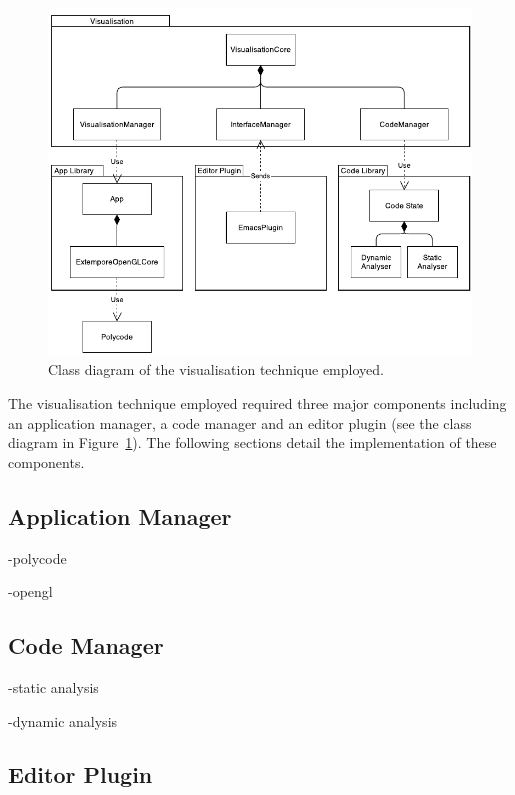 \begin{figure}
  \centering \includegraphics[width=\columnwidth]{../images/diagrams/visualisation-class-diagram.pdf}
  \caption{Class diagram of the visualisation technique employed.}
\label{fig:visualisation-class-diagram}
\end{figure}

The visualisation technique employed required three major components including an application manager, a code manager and an editor plugin (see the class diagram in Figure~\ref{fig:visualisation-class-diagram}). The following sections detail the implementation of these components.

\subsection{Application Manager}

-polycode~\cite{Safrin2013}

-opengl

\subsection{Code Manager}

-static analysis

-dynamic analysis

\subsection{Editor Plugin}

